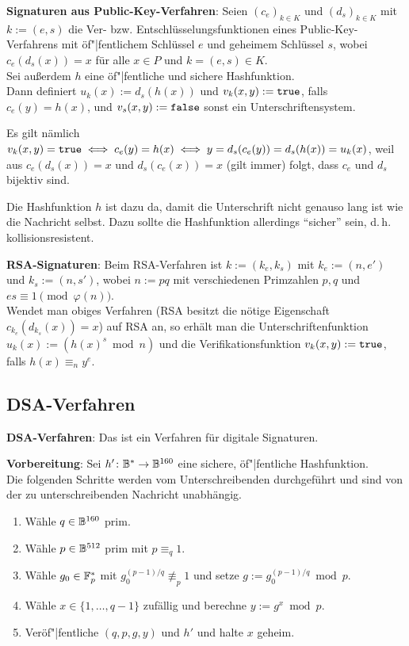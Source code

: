 \textbf{Signaturen aus Public-Key-Verfahren}:
Seien $(c_e)_{k \in K}$ und $(d_s)_{k \in K}$ mit $k := (e, s)$
die Ver- bzw. Entschlüsselungsfunktionen eines Public-Key-Verfahrens mit öf"|fentlichem Schlüssel $e$
und geheimem Schlüssel $s$, wobei $c_e(d_s(x)) = x$ für alle $x \in P$ und $k = (e, s) \in K$.\\
Sei außerdem $h$ eine öf"|fentliche und sichere Hashfunktion.\\
Dann definiert $u_k(x) := d_s(h(x))$ und $v_k(x, y) := \texttt{true}$, falls $c_e(y) = h(x)$,
und $v_s(x, y) := \texttt{false}$ sonst ein Unterschriftensystem.

Es gilt nämlich $v_k(x, y) = \texttt{true} \iff c_e(y) = h(x) \iff y = d_s(c_e(y)) = d_s(h(x)) = u_k(x)$,
weil aus $c_e(d_s(x)) = x$ und $d_s(c_e(x)) = x$ (gilt immer) folgt, dass $c_e$ und $d_s$ bijektiv
sind.

Die Hashfunktion $h$ ist dazu da, damit die Unterschrift nicht genauso lang ist wie die Nachricht
selbst.
Dazu sollte die Hashfunktion allerdings "`sicher"' sein, d.\,h. kollisionsresistent.

\linie

\textbf{RSA-Signaturen}:
Beim RSA-Verfahren ist $k := (k_e, k_s)$ mit $k_e := (n, e')$ und $k_s := (n, s')$,
wobei $n := pq$ mit verschiedenen Primzahlen $p, q$ und $es \equiv 1 \pmod{\varphi(n)}$.\\
Wendet man obiges Verfahren
(RSA besitzt die nötige Eigenschaft $c_{k_e}(d_{k_s}(x)) = x$) auf RSA an,
so erhält man die Unterschriftenfunktion $u_k(x) := (h(x)^s \bmod n)$ und
die Verifikationsfunktion $v_k(x, y) := \texttt{true}$, falls $h(x) \equiv_n y^e$.

\pagebreak

\subsection{%
    DSA-Verfahren%
}

\textbf{DSA-Verfahren}:
Das  ist ein Verfahren für
digitale Signaturen.

\textbf{Vorbereitung}:
Sei $h'\colon \mathbb{B}^\ast \to \mathbb{B}^{160}$ eine sichere, öf"|fentliche Hashfunktion.\\
Die folgenden Schritte werden vom Unterschreibenden durchgeführt und sind von der zu
unterschreibenden Nachricht unabhängig.
\begin{enumerate}
    \item
    Wähle $q \in \mathbb{B}^{160}$ prim.
    
    \item
    Wähle $p \in \mathbb{B}^{512}$ prim mit $p \equiv_q 1$.
    
    \item
    Wähle $g_0 \in \mathbb{F}_p^\ast$ mit $g_0^{(p-1)/q} \not\equiv_p 1$ und setze
    $g := g_0^{(p-1)/q} \bmod p$.
    
    \item
    Wähle $x \in \{1, \dotsc, q - 1\}$ zufällig und berechne $y := g^x \bmod p$.
    
    \item 
    Veröf"|fentliche $(q, p, g, y)$ und $h'$ und halte $x$ geheim.
\end{enumerate}

